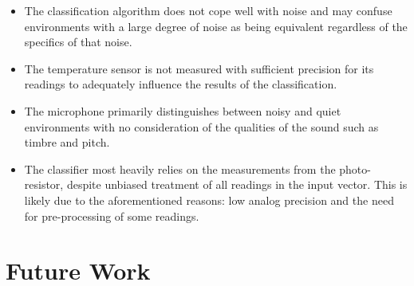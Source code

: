 \documentclass{article}
\begin{document}
\begin{itemize}

  \item The classification algorithm does not cope well with noise and
    may confuse environments with a large degree of noise as being
    equivalent regardless of the specifics of that noise.

  \item The temperature sensor is not measured with sufficient precision
    for its readings to adequately influence the results of the
    classification.

  \item The microphone primarily distinguishes between noisy and quiet
    environments with no consideration of the qualities of the sound
    such as timbre and pitch.

  \item The classifier most heavily relies on the measurements from the
    photo-resistor, despite unbiased treatment of all readings in the
    input vector.  This is likely due to the aforementioned reasons:
    low analog precision and the need for pre-processing of some
    readings.

\end{itemize}

\section{Future Work}
\end{document}
